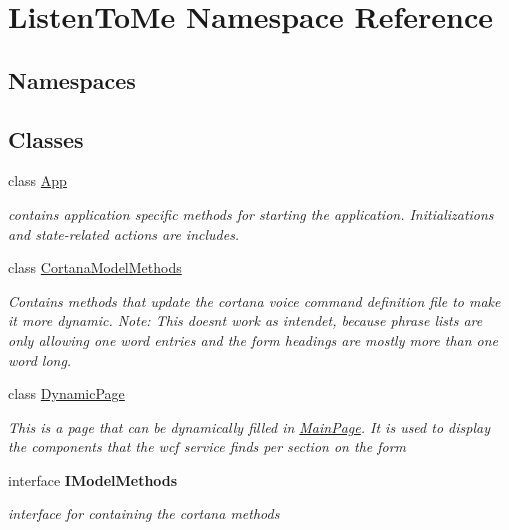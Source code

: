 \hypertarget{namespace_listen_to_me}{}\section{Listen\+To\+Me Namespace Reference}
\label{namespace_listen_to_me}
\subsection*{Namespaces}
\begin{DoxyCompactItemize}
\end{DoxyCompactItemize}
\subsection*{Classes}
\begin{DoxyCompactItemize}
\item 
class \hyperlink{class_listen_to_me_1_1_app}{App}
\begin{DoxyCompactList}\small\item\em contains application specific methods for starting the application. Initializations and state-\/related actions are includes. \end{DoxyCompactList}\item 
class \hyperlink{class_listen_to_me_1_1_cortana_model_methods}{Cortana\+Model\+Methods}
\begin{DoxyCompactList}\small\item\em Contains methods that update the cortana voice command definition file to make it more dynamic. Note\+: This doesn\textquotesingle{}t work as intendet, because phrase lists are only allowing one word entries and the form headings are mostly more than one word long. \end{DoxyCompactList}\item 
class \hyperlink{class_listen_to_me_1_1_dynamic_page}{Dynamic\+Page}
\begin{DoxyCompactList}\small\item\em This is a page that can be dynamically filled in \hyperlink{class_listen_to_me_1_1_main_page}{Main\+Page}. It is used to display the components that the wcf service finds per section on the form \end{DoxyCompactList}\item 
interface {\bfseries I\+Model\+Methods}
\begin{DoxyCompactList}\small\item\em interface for containing the cortana methods \end{DoxyCompactList}\item 

\end{DoxyCompactItemize}
